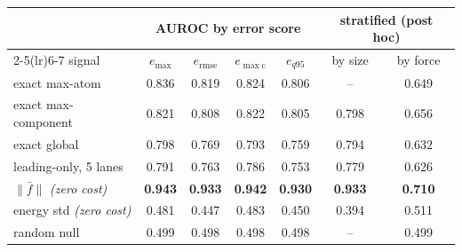\begin{tabular}{lcccccc}
\toprule
& \multicolumn{4}{c}{AUROC by error score} & \multicolumn{2}{c}{stratified (post hoc)}\\
\cmidrule(lr){2-5}\cmidrule(lr){6-7}
signal & $e_{\max}$ & $e_{\mathrm{rmse}}$ & $e_{\max\mathrm{c}}$ & $e_{q95}$ & by size & by force \\
\midrule
exact max-atom & 0.836 & 0.819 & 0.824 & 0.806 & -- & 0.649 \\
exact max-component & 0.821 & 0.808 & 0.822 & 0.805 & 0.798 & 0.656 \\
exact global & 0.798 & 0.769 & 0.793 & 0.759 & 0.794 & 0.632 \\
leading-only, 5 lanes & 0.791 & 0.763 & 0.786 & 0.753 & 0.779 & 0.626 \\
$\|\bar{f}\|$ \emph{(zero cost)} & \textbf{0.943} & \textbf{0.933} & \textbf{0.942} & \textbf{0.930} & \textbf{0.933} & \textbf{0.710} \\
energy std \emph{(zero cost)} & 0.481 & 0.447 & 0.483 & 0.450 & 0.394 & 0.511 \\
random null & 0.499 & 0.498 & 0.498 & 0.498 & -- & 0.499 \\
\bottomrule
\end{tabular}
